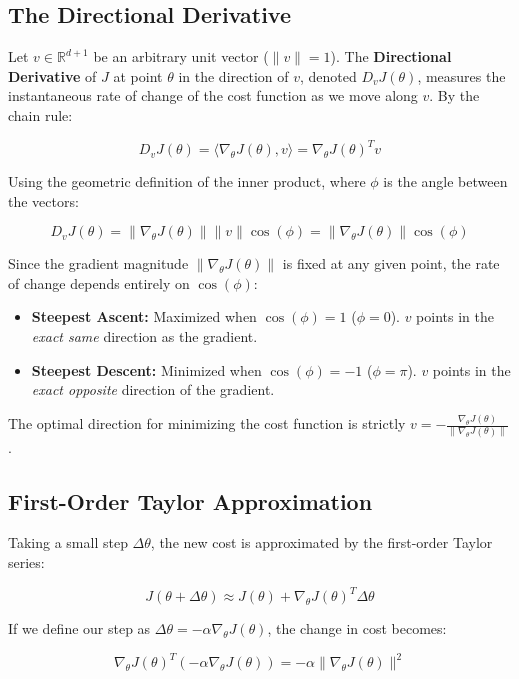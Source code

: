\documentclass[12pt, a4paper]{report}
\begin{document}
\subsection{The Directional Derivative}

Let $v \in \mathbb{R}^{d+1}$ be an arbitrary unit vector ($\|v\| = 1$). The \textbf{Directional Derivative} of $J$ at point $\theta$ in the direction of $v$, denoted $D_v J(\theta)$, measures the instantaneous rate of change of the cost function as we move along $v$. By the chain rule:

\[ D_v J(\theta) = \langle \nabla_\theta J(\theta), v \rangle = \nabla_\theta J(\theta)^T v \]

Using the geometric definition of the inner product, where $\phi$ is the angle between the vectors:

\[ D_v J(\theta) = \|\nabla_\theta J(\theta)\| \|v\| \cos(\phi) = \|\nabla_\theta J(\theta)\| \cos(\phi) \]

Since the gradient magnitude $\|\nabla_\theta J(\theta)\|$ is fixed at any given point, the rate of change depends entirely on $\cos(\phi)$:

\begin{itemize}
    \item \textbf{Steepest Ascent:} Maximized when $\cos(\phi) = 1$ ($\phi = 0$). $v$ points in the \textit{exact same} direction as the gradient.
    \item \textbf{Steepest Descent:} Minimized when $\cos(\phi) = -1$ ($\phi = \pi$). $v$ points in the \textit{exact opposite} direction of the gradient.
\end{itemize}

The optimal direction for minimizing the cost function is strictly $v = -\frac{\nabla_\theta J(\theta)}{\|\nabla_\theta J(\theta)\|}$.

\subsection{First-Order Taylor Approximation}

Taking a small step $\Delta \theta$, the new cost is approximated by the first-order Taylor series:

\[ J(\theta + \Delta \theta) \approx J(\theta) + \nabla_\theta J(\theta)^T \Delta \theta \]

If we define our step as $\Delta \theta = -\alpha \nabla_\theta J(\theta)$, the change in cost becomes:

\[ \nabla_\theta J(\theta)^T (-\alpha \nabla_\theta J(\theta)) = -\alpha \|\nabla_\theta J(\theta)\|^2 \]
\end{document}
